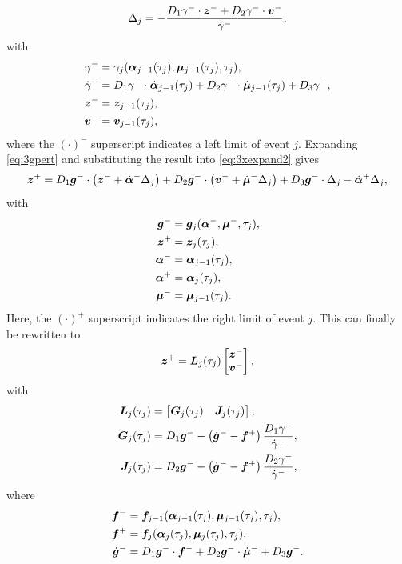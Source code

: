\documentclass[../DC2017114Bouma.tex]{subfiles}
\begin{document}
\begin{align}
\Delta_{j} = -\frac{D_1\gamma^{-}\cdot{\boldsymbol{z}}^- + D_2\gamma^{-}\cdot{\boldsymbol{v}}^-}{\dot{\gamma}^{-}},\label{eq:3Deltaj}
\end{align}
with
\begin{align*}
\gamma^- &= \gamma_j(\boldsymbol{\alpha}_{j-1}(\tau_j),\boldsymbol{\mu}_{j-1}(\tau_j),\tau_j),\\
\dot{\gamma}^- &= D_1\gamma^-\cdot\dot{\boldsymbol{\alpha}}_{j-1}(\tau_j) + D_2\gamma^-\cdot\dot{\boldsymbol{\mu}}_{j-1}(\tau_j) + D_3\gamma^-,\\
{\boldsymbol{z}}^- &= {\boldsymbol{z}}_{j-1}(\tau_j),\\
{\boldsymbol{v}}^- &= {\boldsymbol{v}}_{j-1}(\tau_j),
\end{align*}
where the $(\cdot)^-$ superscript indicates a left limit of event $j$. Expanding \eqref{eq:3gpert} and substituting the result into \eqref{eq:3xexpand2} gives
\begin{equation}
{\boldsymbol{z}}^+ = D_1{\boldsymbol{g}}^-\cdot\left({\boldsymbol{z}}^- + \dot{\boldsymbol{\alpha}}^-\Delta_j\right) + D_2{\boldsymbol{g}}^-\cdot\left({\boldsymbol{v}}^- + \dot{\boldsymbol{\mu}}^-\Delta_j\right) + D_3{\boldsymbol{g}}^-\cdot\Delta_j - \dot{\boldsymbol{\alpha}}^+\Delta_j,
\end{equation}
with
\begin{align*}
{\boldsymbol{g}}^- &= {\boldsymbol{g}}_j(\boldsymbol{\alpha}^-,\boldsymbol{\mu}^-,\tau_j),\\
{\boldsymbol{z}}^+ &= {\boldsymbol{z}}_j(\tau_j),\\
\boldsymbol{\alpha}^- &= \boldsymbol{\alpha}_{j-1}(\tau_j),\\
\boldsymbol{\alpha}^+ &= \boldsymbol{\alpha}_j(\tau_j),\\
\boldsymbol{\mu}^- &= \boldsymbol{\mu}_{j-1}(\tau_j).
\end{align*}
Here, the $(\cdot)^+$ superscript indicates the right limit of event $j$. This can finally be rewritten to
\begin{align}
{\boldsymbol{z}}^+ = {\boldsymbol{L}}_j(\tau_j)\begin{bmatrix}
{\boldsymbol{z}}^- \\ {\boldsymbol{v}}^-
\end{bmatrix},
\end{align}
with 
\begin{align*}
{\boldsymbol{L}}_j(\tau_j) &= \begin{bmatrix}
{\boldsymbol{G}}_j(\tau_j) & {\boldsymbol{J}}_j(\tau_j)
\end{bmatrix},\\
{\boldsymbol{G}}_j(\tau_j) & = D_1{\boldsymbol{g}}^- - \left(\dot{{\boldsymbol{g}}}^- - {\boldsymbol{f}}^+\right)\frac{D_1\gamma^-}{\dot{\gamma}^-},\\
{\boldsymbol{J}}_j(\tau_j) & = D_2{\boldsymbol{g}}^- - \left(\dot{{\boldsymbol{g}}}^- - {\boldsymbol{f}}^+\right)\frac{D_2\gamma^-}{\dot{\gamma}^-},
\end{align*}
where
\begin{align*}
{\boldsymbol{f}}^- &= {\boldsymbol{f}}_{j-1}(\boldsymbol{\alpha}_{j-1}(\tau_j),\boldsymbol{\mu}_{j-1}(\tau_j),\tau_j),\\
{\boldsymbol{f}}^+ &= {\boldsymbol{f}}_j(\boldsymbol{\alpha}_j(\tau_j),\boldsymbol{\mu}_j(\tau_j),\tau_j),\\
\dot{{\boldsymbol{g}}}^- &= D_1{\boldsymbol{g}}^-\cdot {\boldsymbol{f}}^- + D_2{\boldsymbol{g}}^-\cdot \dot{\boldsymbol{\mu}}^- + D_3{\boldsymbol{g}}^-.
\end{align*}
\end{document}
